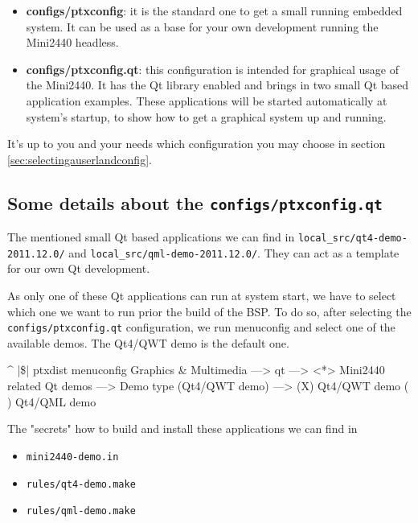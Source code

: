 \begin{itemize}
	\item \textbf{configs/ptxconfig}: it is the standard one to get a small
	running embedded system. It can be used as a base for your own
	development running the Mini2440 headless.
	\item \textbf{configs/ptxconfig.qt}: this configuration is intended for
	graphical usage of the Mini2440. It has the Qt library enabled and brings
	in two small Qt based application examples. These applications will be
	started automatically at system's startup, to show how to get a
	graphical system up and running.
\end{itemize}

It's up to you and your needs which configuration you may choose in section
\ref{sec:selectingauserlandconfig}.

\subsection{Some details about the \texttt{configs/ptxconfig.qt}}

The mentioned small Qt based applications we can find in
\texttt{local\_src/qt4-demo-2011.12.0/} and \texttt{local\_src/qml-demo-2011.12.0/}.
They can act as a template for our own Qt development.

As only one of these Qt applications can run at system start, we have to select
which one we want to run prior the build of the BSP. To do so, after selecting
the \texttt{configs/ptxconfig.qt} configuration, we run menuconfig and select
one of the available demos. The Qt4/QWT demo is the default one.

\begin{ptxshell}[escapechar=|]{^}
|\$| ptxdist menuconfig
  Graphics & Multimedia  --->
     qt --->
        <*> Mini2440 related Qt demos --->
           Demo type (Qt4/QWT demo) --->
              (X) Qt4/QWT demo
              ( ) Qt4/QML demo
\end{ptxshell}

The "secrets" how to build and install these applications we can find in

\begin{itemize}
	\item \texttt{mini2440-demo.in}
	\item \texttt{rules/qt4-demo.make}
	\item \texttt{rules/qml-demo.make}
\end{itemize}

